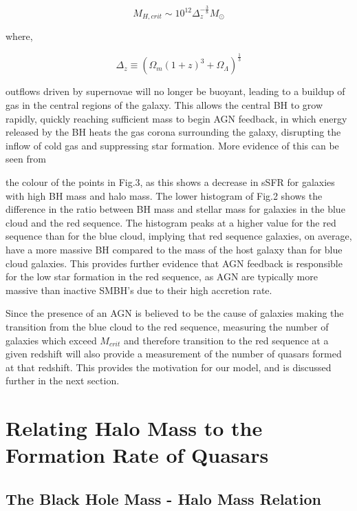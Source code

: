 \documentclass[12pt, twocolumn]{report}%
\begin{document}
\begin{equation}
    M_{H,crit}\sim10^{12}\Delta_{z}^{-\frac{3}{8}}M_\odot
\end{equation}

\noindent where,

\begin{equation}
    \Delta_z\equiv(\Omega_m(1+z)^3+\Omega_\Lambda)^{\frac{1}{3}}
\end{equation}

\noindent outflows driven by supernovae will no longer be buoyant, leading to a buildup of gas in the central regions of the galaxy. This allows the central BH to grow rapidly, quickly reaching sufficient mass to begin AGN feedback, in which energy released by the BH heats the gas corona surrounding the galaxy, disrupting the inflow of cold gas and suppressing star formation. More evidence of this can be seen from

\noindent the colour of the points in Fig.3, as this shows a decrease in sSFR for galaxies with high BH mass and halo mass. The lower histogram of Fig.2 shows the difference in the ratio between BH mass and stellar mass for galaxies in the blue cloud and the red sequence. The histogram peaks at a higher value for the red sequence than for the blue cloud, implying that red sequence galaxies, on average, have a more massive BH compared to the mass of the host galaxy than for blue cloud galaxies. This provides further evidence that AGN feedback is responsible for the low star formation in the red sequence, as AGN are typically more massive than inactive SMBH's due to their high accretion rate.\par

Since the presence of an AGN is believed to be the cause of galaxies making the transition from the blue cloud to the red sequence, measuring the number of galaxies which exceed $M_{crit}$ and therefore transition to the red sequence at a given redshift will also provide a measurement of the number of quasars formed at that redshift. This provides the motivation for our model, and is discussed further in the next section.

\section{Relating Halo Mass to the Formation Rate of Quasars}
\subsection{The Black Hole Mass - Halo Mass Relation}
\end{document}

